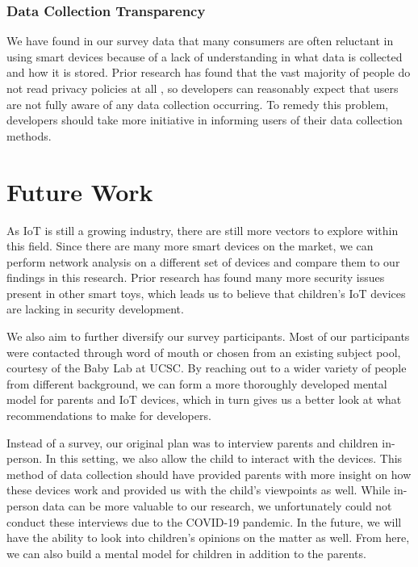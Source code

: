 \documentclass[12pt]{ucthesis}
\begin{document}
\subsubsection{Data Collection Transparency}
We have found in our survey data that many consumers are often reluctant in using smart devices because of a lack of understanding in what data is collected and how it is stored. Prior research has found that the vast majority of people do not read privacy policies at all \cite{privacypolicy}, so developers can reasonably expect that users are not fully aware of any data collection occurring. To remedy this problem, developers should take more initiative in informing users of their data collection methods. 

\section{Future Work}
As IoT is still a growing industry, there are still more vectors to explore within this field. Since there are many more smart devices on the market, we can perform network analysis on a different set of devices and compare them to our findings in this research. Prior research has found many more security issues present in other smart toys\cite{cardenas:smarttoys}, which leads us to believe that children's IoT devices are lacking in security development.

We also aim to further diversify our survey participants. Most of our participants were contacted through word of mouth or chosen from an existing subject pool, courtesy of the Baby Lab at UCSC. By reaching out to a wider variety of people from different background, we can form a more thoroughly developed mental model for parents and IoT devices, which in turn gives us a better look at what recommendations to make for developers.

Instead of a survey, our original plan was to interview parents and children in-person. In this setting, we also allow the child to interact with the devices. This method of data collection should have provided parents with more insight on how these devices work and provided us with the child's viewpoints as well. While in-person data can be more valuable to our research, we unfortunately could not conduct these interviews due to the COVID-19 pandemic. In the future, we will have the ability to look into children's opinions on the matter as well. From here, we can also build a mental model for children in addition to the parents.

\nocite{*}


\end{document}
